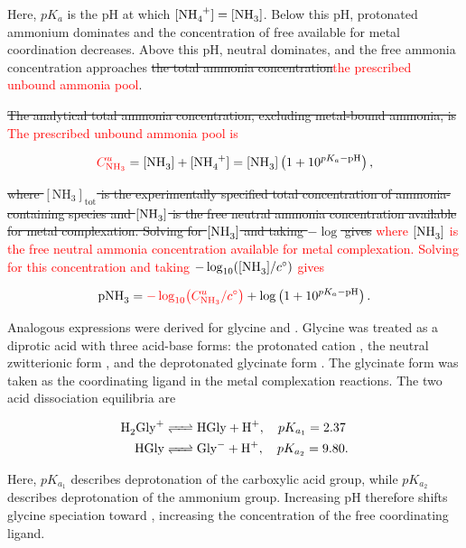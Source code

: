 \documentclass[twoside,twocolumn,9pt]{article}
\begin{document}
Here, \(pK_a\) is the pH at which \([\ce{NH4+}] = [\ce{NH3}]\). Below this pH, protonated ammonium dominates and the concentration of free  available for metal coordination decreases. Above this pH, neutral  dominates, and the free ammonia concentration approaches \sout{the total ammonia concentration}\textcolor{red}{the prescribed unbound ammonia pool}.

\sout{The analytical total ammonia concentration, excluding metal-bound ammonia, is} \textcolor{red}{The prescribed unbound ammonia pool is}

\begin{equation} \label{eq:NH3_massbalance}
    \textcolor{red}{C_{\mathrm{NH_3}}^u}
    = [\ce{NH3}] + [\ce{NH4+}] 
    = [\ce{NH3}]\left(1 + 10^{pK_a - \mathrm{pH}}\right),
\end{equation}

\sout{where \([\mathrm{NH}_3]_{\mathrm{tot}}\) is the experimentally specified total concentration of ammonia-containing species and \([\ce{NH3}]\) is the free neutral ammonia concentration available for metal complexation. Solving for \([\ce{NH3}]\) and taking \(-\log\) gives} \textcolor{red}{where $[\ce{NH3}]$ is the free neutral ammonia concentration available for metal complexation. Solving for this concentration and taking $-\log_{10}([\ce{NH3}]/c^\circ)$ gives}

\begin{equation} \label{eq:pNH3}
    \mathrm{pNH}_3 
    = \textcolor{red}{-\log_{10}\!\left(C_{\mathrm{NH_3}}^u/c^\circ\right)}
    + \log\left(1 + 10^{pK_a - \mathrm{pH}}\right).
\end{equation}

Analogous expressions were derived for glycine and . Glycine was treated as a diprotic acid with three acid-base forms: the protonated cation , the neutral zwitterionic form , and the deprotonated glycinate form . The glycinate form was taken as the coordinating ligand in the metal complexation reactions. The two acid dissociation equilibria are

\begin{align} \label{eq:Gly_equilibria}
    \ce{H2Gly+ &<=> HGly + H+},  \quad pK_{a_1} = 2.37 \nonumber \\
    \ce{HGly   &<=> Gly^- + H+}, \quad pK_{a_2} = 9.80 .
\end{align}

Here, \(pK_{a_1}\) describes deprotonation of the carboxylic acid group, while \(pK_{a_2}\) describes deprotonation of the ammonium group. Increasing pH therefore shifts glycine speciation toward , increasing the concentration of the free coordinating ligand.
\end{document}
